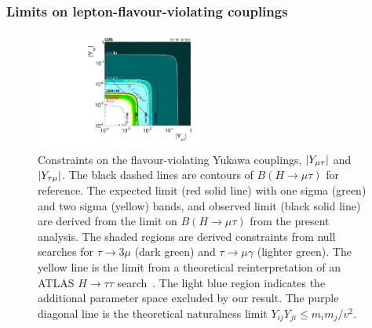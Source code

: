 \documentclass[oneside, letterpaper, oldfontcommands]{memoir}
\DeclarePairedDelimiter{\abs}{\lvert}{\rvert}
\begin{document}
 \subsubsection{Limits on lepton-flavour-violating couplings}
\begin{figure}[hbt]\centering
\includegraphics[width=0.49\textwidth]{yukawa.pdf}
 \caption{\cite{Khachatryan:2015kon}Constraints on the flavour-violating Yukawa couplings, $\abs{Y_{\mu\tau}}$ and $\abs{Y_{\tau\mu}}$.
The black dashed lines are contours of $B(H \rightarrow \mu \tau )$ for reference.
The expected limit (red solid line) with one sigma (green)  and two sigma (yellow) bands, and observed limit (black solid line) are derived from the limit on $B(H \rightarrow \mu \tau )$ from the present analysis.  The shaded regions are derived constraints from null searches for $\tau \rightarrow 3\mu$ (dark green) and $\tau \rightarrow \mu \gamma$ (lighter green). 
The yellow line is the limit from a theoretical reinterpretation of an ATLAS $H \rightarrow \tau \tau$ search~\cite{Harnik:2012pb}.
The light blue region indicates the additional parameter space excluded by our result.
The purple diagonal line is the theoretical naturalness
limit $Y_{ij}Y_{ji} \leq m_im_j/v^2$. }
 \label{fig:yukawalimits}\end{figure}
\end{document}
